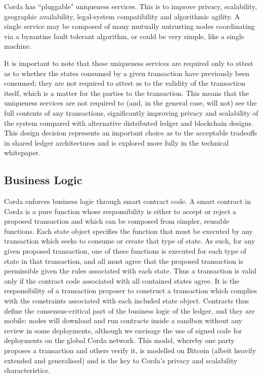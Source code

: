 \documentclass{article}
\begin{document}
Corda has ``pluggable" uniqueness services. This is to improve privacy, scalability, geographic availability, legal-system compatibility\cite{EUC} and algorithmic agility. A single service may be composed of many mutually untrusting nodes coordinating via a byzantine fault tolerant algorithm, or could be very simple, like a single machine.

It is important to note that these uniqueness services are required only to attest as to whether the states consumed by a given transaction have previously been consumed; they are not required to attest as to the validity of the transaction itself, which is a matter for the parties to the transaction. This means that the uniqueness services are not required to (and, in the general case, will not) see the full contents of any transactions, significantly improving privacy and scalability of the system compared with alternative distributed ledger and blockchain designs.  This design decision represents an important choice as to the acceptable tradeoffs in shared ledger architectures and is explored more fully in the technical whitepaper.

\subsection{Business Logic}
Corda enforces business logic through smart contract code. A smart contract in Corda is a pure function whose responsibility is either to accept or reject a proposed transaction and which can be composed from simpler, reusable functions. Each state object specifies the function that must be executed by any transaction which seeks to consume or create that type of state. As such, for any given proposed transaction, one of these functions is executed for each type of state in that transaction, and all must agree that the proposed transaction is permissible given the rules associated with each state. Thus a transaction is valid only if the contract code associated with all contained states agree. It is the responsibility of a transaction proposer to construct a transaction which complies with the constraints associated with each included state object. Contracts thus define the consensus-critical part of the business logic of the ledger, and they are mobile: nodes will download and run contracts inside a sandbox without any review in some deployments, although we envisage the use of signed code for deployments on the global Corda network. This model, whereby one party proposes a transaction and others verify it, is modelled on Bitcoin (albeit heavily extended and generalised) and is the key to Corda's privacy and scalability characteristics.
\end{document}
